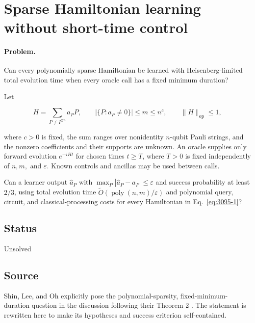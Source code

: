 \section{Sparse Hamiltonian learning without short-time control}
\label{sec:op_30954594cf01ebb3}

\paragraph{Problem.}
Can every polynomially sparse Hamiltonian be learned with Heisenberg-limited total evolution time when every oracle call has a fixed minimum duration?

Let

\begin{equation}
H=\sum_{P\neq I^{\otimes n}}a_PP,
\qquad
|\{P:a_P\neq0\}|\leq m\leq n^c,
\qquad
\|H\|_{\mathrm{op}}\leq1,
\label{eq:3095-1}
\end{equation}

where $c>0$ is fixed, the sum ranges over nonidentity $n$-qubit Pauli strings, and the nonzero coefficients and their supports are unknown. An oracle supplies only forward evolution $e^{-iHt}$ for chosen times $t\geq T$, where $T>0$ is fixed independently of $n,m,$ and $\varepsilon$. Known controls and ancillas may be used between calls.

Can a learner output $\widehat a_P$ with $\max_P|\widehat a_P-a_P|\leq\varepsilon$ and success probability at least $2/3$, using total evolution time $\widetilde O(\operatorname{poly}(n,m)/\varepsilon)$ and polynomial query, circuit, and classical-processing costs for every Hamiltonian in Eq.~\eqref{eq:3095-1}?

\subsection*{Status}

Unsolved

\subsection*{Source}

Shin, Lee, and Oh explicitly pose the polynomial-sparsity, fixed-minimum-duration question in the discussion following their Theorem 2 . The statement is rewritten here to make its hypotheses and success criterion self-contained.


